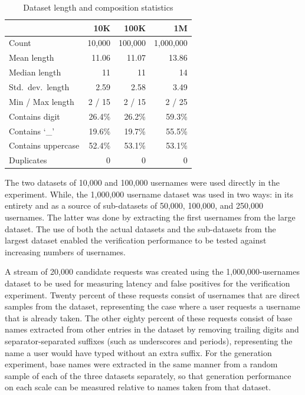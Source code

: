 \documentclass[conference]{IEEEtran}
\begin{document}
\begin{table}[h]
\centering
\caption{Dataset length and composition statistics}
\label{tab:dataset-stats}
\begin{tabular}{lrrr}
\toprule
 & 10K & 100K & 1M \\
\midrule
Count             & 10{,}000 & 100{,}000 & 1{,}000{,}000 \\
Mean length       & 11.06    & 11.07     & 13.86 \\
Median length     & 11        & 11        & 14 \\
Std.\ dev.\ length & 2.59     & 2.58      & 3.49 \\
Min / Max length  & 2 / 15    & 2 / 15    & 2 / 25 \\
Contains digit    & 26.4\%   & 26.2\%    & 59.3\% \\
Contains `\_'     & 19.6\%   & 19.7\%    & 55.5\% \\
Contains uppercase & 52.4\%  & 53.1\%    & 53.1\% \\
Duplicates        & 0        & 0         & 0 \\
\bottomrule
\end{tabular}
\end{table}

The two datasets of 10,000 and 100,000 usernames were used directly in the experiment. While, the 1,000,000 username dataset was used in two ways: in its entirety and as a source of sub-datasets of 50,000, 100,000, and 250,000 usernames. The latter was done by extracting the first usernames from the large dataset. The use of both the actual datasets and the sub-datasets from the largest dataset enabled the verification performance to be tested against increasing numbers of usernames.

A stream of 20,000 candidate requests was created using the 1,000,000-usernames dataset to be used for measuring latency and false positives for the verification experiment. Twenty percent of these requests consist of usernames that are direct samples from the dataset, representing the case where a user requests a username that is already taken. The other eighty percent of these requests consist of base names extracted from other entries in the dataset by removing trailing digits and separator-separated suffixes (such as underscores and periods), representing the name a user would have typed without an extra suffix. For the generation experiment, base names were extracted in the same manner from a random sample of each of the three datasets separately, so that generation performance on each scale can be measured relative to names taken from that dataset.
\end{document}
